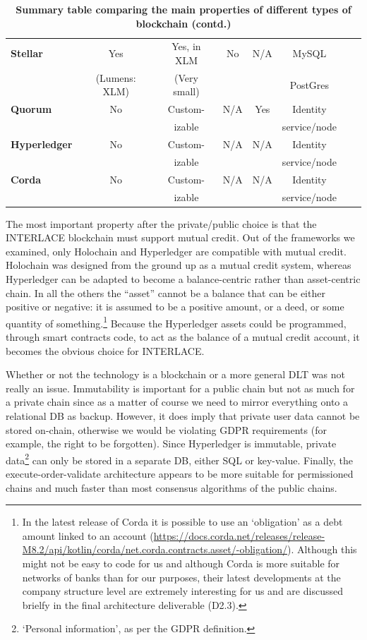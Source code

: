 \begin{table}
\begin{centering}
{\begin{tabular}{| l | c | c | c | c | c | c | c |}
\textbf{Stellar}		&Yes			&Yes, in XLM	&No
				&N/A			&MySQL		&				&\\
				&(Lumens: XLM)&(Very small)	&
				&			&PostGres	&				&\\				
\hline
\textbf{Quorum} 	&No			&Custom-		&N/A
				&Yes			&Identity		&				&\\
			 	&			&izable		&
				& 			&service/node	&				& \\
\hline
\textbf{Hyperledger}	&No			&Custom-		&N/A
				&N/A			&Identity		&				&\\
 				&			&izable		&
				&			&service/node	&				& \\
\hline
\textbf{Corda} 		&No			&Custom-		&N/A
				&N/A			&Identity		&				& \\
		 		&			&izable		&
				& 			&service/node	&				& \\
\hline
\end{tabular}}
\caption{\bf \small Summary table comparing the main properties of different types of blockchain (contd.)}
\label{blockchain_types2}
\end{centering}
\end{table}


The most important property after the private/public choice is that the INTERLACE blockchain must support mutual credit. Out of the frameworks we examined, only Holochain and Hyperledger are compatible with mutual credit. Holochain was designed from the ground up as a mutual credit system, whereas Hyperledger can be adapted to become a balance-centric rather than asset-centric chain. In all the others the ``asset'' cannot be a balance that can be either positive or negative: it is assumed to be a positive amount, or a deed, or some quantity of something.\footnote{In the latest release of Corda it is possible to use an `obligation' as a debt amount linked to an account (\url{https://docs.corda.net/releases/release-M8.2/api/kotlin/corda/net.corda.contracts.asset/-obligation/}). Although this might not be easy to code for us and although Corda is more suitable for networks of banks than for our purposes, their latest developments at the company structure level are extremely interesting for us and are discussed brielfy in the final architecture deliverable (D2.3).} Because the Hyperledger assets could be programmed, through smart contracts code, to act as the balance of a mutual credit account, it becomes the obvious choice for INTERLACE.


Whether or not the technology is a blockchain or a more general DLT was not really an issue. Immutability is important for a public chain but not as much for a private chain since as a matter of course we need to mirror everything onto a relational DB as backup. However, it does imply that private user data cannot be stored on-chain, otherwise we would be violating GDPR requirements (for example, the right to be forgotten). Since Hyperledger is immutable, private data\footnote{`Personal information', as per the GDPR definition.} can only be stored in a separate DB, either SQL or key-value. Finally, the execute-order-validate architecture appears to be more suitable for permissioned chains and much faster than most consensus algorithms of the public chains.


